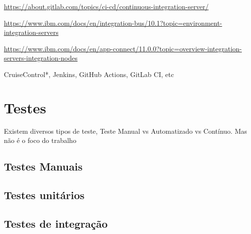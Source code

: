 \url{https://about.gitlab.com/topics/ci-cd/continuous-integration-server/}

\url{https://www.ibm.com/docs/en/integration-bus/10.1?topic=environment-integration-servers}

\url{https://www.ibm.com/docs/en/app-connect/11.0.0?topic=overview-integration-servers-integration-nodes}

CruiseControl*, Jenkins, GitHub Actions, GitLab CI, etc


\section{Testes}
Existem diversos tipos de teste, Teste Manual vs Automatizado vs Contínuo. Mas não é o foco do trabalho

\subsection{Testes Manuais}
\subsection{Testes unitários}
\subsection{Testes de integração}

